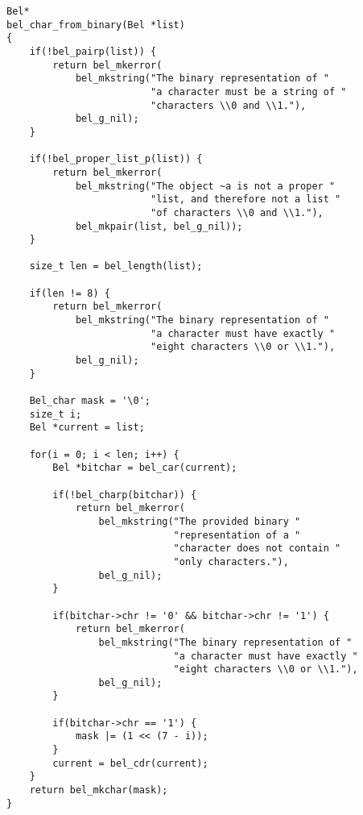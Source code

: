 \documentclass[openright,a4paper,twoside,12pt]{memoir}
\begin{document}
\begin{verbatim}
Bel*
bel_char_from_binary(Bel *list)
{
    if(!bel_pairp(list)) {
        return bel_mkerror(
            bel_mkstring("The binary representation of "
                         "a character must be a string of "
                         "characters \\0 and \\1."),
            bel_g_nil);
    }

    if(!bel_proper_list_p(list)) {
        return bel_mkerror(
            bel_mkstring("The object ~a is not a proper "
                         "list, and therefore not a list "
                         "of characters \\0 and \\1."),
            bel_mkpair(list, bel_g_nil));
    }

    size_t len = bel_length(list);

    if(len != 8) {
        return bel_mkerror(
            bel_mkstring("The binary representation of "
                         "a character must have exactly "
                         "eight characters \\0 or \\1."),
            bel_g_nil);
    }
    
    Bel_char mask = '\0';
    size_t i;
    Bel *current = list;
    
    for(i = 0; i < len; i++) {
        Bel *bitchar = bel_car(current);

        if(!bel_charp(bitchar)) {
            return bel_mkerror(
                bel_mkstring("The provided binary "
                             "representation of a "
                             "character does not contain "
                             "only characters."),
                bel_g_nil);
        }

        if(bitchar->chr != '0' && bitchar->chr != '1') {
            return bel_mkerror(
                bel_mkstring("The binary representation of "
                             "a character must have exactly "
                             "eight characters \\0 or \\1."),
                bel_g_nil);
        }
        
        if(bitchar->chr == '1') {
            mask |= (1 << (7 - i));
        }
        current = bel_cdr(current);
    }
    return bel_mkchar(mask);
}
\end{verbatim}
\end{document}
